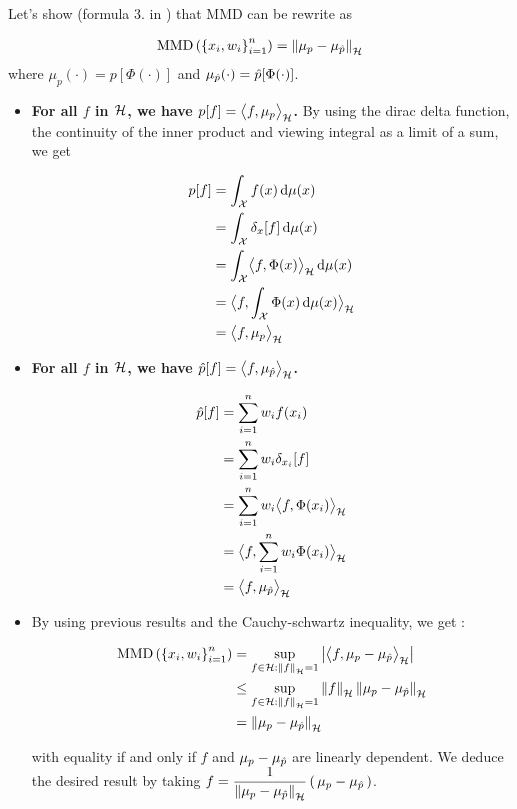  Let's show (formula 3. in \cite{FWBQ}) that MMD can be rewrite as
 \begin{boxtheorem}
   \begin{align}
     \operatorname { MMD } \left( \left\{ x _ { i } , w _ { i } \right\} _ { i = 1 } ^ { n } \right) = \left\| \mu _ { p } - \mu _ { \hat { p } } \right\| _ { \mathcal { H } }
   \end{align}
   where $\mu_p(\cdot) = p[\Phi(\cdot)]$ and $\mu_{\hat{p}}(\cdot) = \hat{p}[\Phi(\cdot)]$.
 \end{boxtheorem}

   \begin{itemize}[leftmargin=*, font= \color{blue} \large, label= $\bullet$]
     \item \textbf{For all $f$ in $\mathcal{H}$, we have $p[f] = \bigl \langle f , \mu_p \bigr \rangle_{\mathcal{H}}$.} By using
     the dirac delta function, the continuity of the inner product and viewing integral
     as a limit of a sum, we get
     \begin{boxcomputation}
     \begin{align*}
       p[f] &= \int_{\X} f(x) \d \mu(x)\\
       &= \int_{\X} \delta_x[f]  \d \mu(x)\\
       &= \int_{\X} \bigps{f}{\Phi(x)}  \d \mu(x)\\%
       &=  \bigps{f}{\int_{\X} \Phi(x) \d \mu(x)} \\
       &= \bigps{f}{\mu_p}
     \end{align*}
      \end{boxcomputation}
     \item \textbf{For all $f$ in $\mathcal{H}$, we have $\hat{p}[f] = \bigl \langle f , \mu_{\hat{p}} \bigr \rangle_{\mathcal{H}}$.}
     \begin{boxcomputation}
     \begin{align*}
       \p[f] &= \sum_{i=1}^n w_i f(x_i)\\
       &= \sum_{i=1}^n w_i \delta_{x_i}[f]\\
       &= \sum_{i=1}^n w_i \bigps{f}{\Phi(x_i)}\\%
       &=  \bigps{f}{\sum_{i=1}^n w_i \Phi(x_i)} \\
       &= \bigps{f}{\mu_{\p}}
     \end{align*}
   \end{boxcomputation}
\item By using previous results and the Cauchy-schwartz inequality, we get :
\begin{boxcomputation}
\begin{align*}
\MMD &= \sup _ { f \in \H : \norme{f} = 1 } \abs{
\bigps{f}{\mu_{p}-\mu_{\p}} }\\
&\leq \sup _ { f \in \H : \norme{f} = 1 } \norme{f} \norme{\mu_{p}-\mu_{\p}}\\
&= \norme{\mu_{p}-\mu_{\p}}
\end{align*}
 \end{boxcomputation}
with equality if and only if $f$ and  $\mu_{p}-\mu_{\hat{p}}$ are linearly dependent.
We deduce the desired result by taking $ \displaystyle f = \frac{1}{\norme{\mu_{p}-\mu_{\p}}}\prt{\mu_{p}-\mu_{\p}}$.

   \end{itemize}



